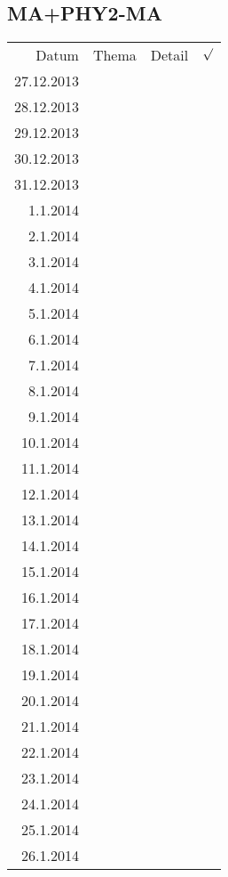 \subsection{MA+PHY2-MA}
\begin{tabular}{r l p{} l}
\rowcolor{lgray} Datum       & Thema         & Detail & $\surd$ \\
\rowcolor{white}  27.12.2013 &               &  &  \\
\rowcolor{lgray}  28.12.2013 &               &  &  \\
\rowcolor{white}  29.12.2013 &               &  &  \\
\rowcolor{lgray}  30.12.2013 &               &  &  \\
\rowcolor{white}  31.12.2013 &               &  &  \\
\rowcolor{lgray}    1.1.2014 &               &  &  \\
\rowcolor{white}    2.1.2014 &               &  &  \\
\rowcolor{lgray}    3.1.2014 &               &  &  \\
\rowcolor{white}    4.1.2014 &               &  &  \\
\rowcolor{lgray}    5.1.2014 &               &  &  \\
\rowcolor{white}    6.1.2014 &               &  &  \\
\rowcolor{lgray}    7.1.2014 &               &  &  \\
\rowcolor{white}    8.1.2014 &               &  &  \\
\rowcolor{lgray}    9.1.2014 &               &  &  \\
\rowcolor{white}   10.1.2014 &               &  &  \\
\rowcolor{lgray}   11.1.2014 &               &  &  \\
\rowcolor{white}   12.1.2014 &               &  &  \\
\rowcolor{lgray}   13.1.2014 &               &  &  \\
\rowcolor{white}   14.1.2014 &               &  &  \\
\rowcolor{lgray}   15.1.2014 &               &  &  \\
\rowcolor{white}   16.1.2014 &               &  &  \\
\rowcolor{lgray}   17.1.2014 &               &  &  \\
\rowcolor{white}   18.1.2014 &               &  &  \\
\rowcolor{lgray}   19.1.2014 &               &  &  \\
\rowcolor{white}   20.1.2014 &               &  &  \\
\rowcolor{lgray}   21.1.2014 &               &  &  \\
\rowcolor{white}   22.1.2014 &               &  &  \\
\rowcolor{lgray}   23.1.2014 &               &  &  \\
\rowcolor{white}   24.1.2014 &               &  &  \\
\rowcolor{lgray}   25.1.2014 &               &  &  \\
\rowcolor{white}   26.1.2014 &               &  &  \\
\end{tabular}

